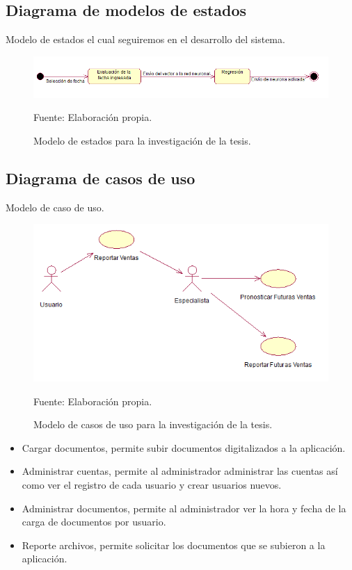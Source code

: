 \subsection{Diagrama de modelos de estados}
Modelo de estados el cual seguiremos en el desarrollo del sistema.

\begin{figure}[h!]
	\centering
		\includegraphics[scale=0.7]{imagenes/modeloestados.png}
		\caption{Modelo de estados para la investigación de la tesis.}
	\begin{center}
    Fuente: Elaboración propia.
    \end{center}
	\label{fig:ModeloEstado}
\end{figure}

\subsection{Diagrama de casos de uso}
Modelo de caso de uso.

\begin{figure}[h!]
	\centering
		\includegraphics[scale=0.6]{imagenes/usecase.png}
		\caption{Modelo de casos de uso para la investigación de la tesis.}
	\begin{center}
    Fuente: Elaboración propia.
    \end{center}
	\label{fig:diagramaCasosUsoTesis}
\end{figure}
\begin{itemize}
    \item Cargar documentos, permite subir documentos digitalizados a la aplicación.
    \item Administrar cuentas, permite al administrador administrar las cuentas así como ver el registro de cada usuario y crear usuarios nuevos.
    \item Administrar documentos, permite al administrador ver la hora y fecha de la carga de documentos por usuario.
    \item Reporte archivos, permite solicitar los documentos que se subieron a la aplicación.
\end{itemize}

